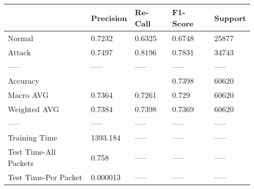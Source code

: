 \begin{tabular}{lllll}
\toprule
{} & Precision & Re-Call & F1-Score & Support \\
\midrule
Normal                &    0.7232 &  0.6325 &   0.6748 &   25877 \\
Attack                &    0.7497 &  0.8196 &   0.7831 &   34743 \\
-----                 &     ----- &   ----- &    ----- &   ----- \\
Accuracy              &           &         &   0.7398 &   60620 \\
Macro AVG             &    0.7364 &  0.7261 &    0.729 &   60620 \\
Weighted AVG          &    0.7384 &  0.7398 &   0.7369 &   60620 \\
-----                 &     ----- &   ----- &    ----- &   ----- \\
Training Time         &  1393.184 &   ----- &    ----- &   ----- \\
Test Time-All Packets &     0.758 &   ----- &    ----- &   ----- \\
Test Time-Per Packet  &  0.000013 &   ----- &    ----- &   ----- \\
\bottomrule
\end{tabular}
